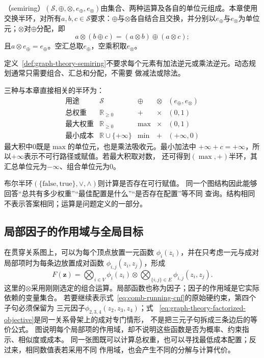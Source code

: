\begin{definition}[交换半环]
\label{def:graph-theory-semiring}
（semiring）$(\mathcal S,\oplus,\otimes,e_{\oplus},e_{\otimes})$由集合、两种运算及各自的单位元组成。本章使用交换半环，对所有$a,b,c\in\mathcal S$要求：$\oplus$与$\otimes$各自结合且交换，并分别以$e_{\oplus}$与$e_{\otimes}$为单位元；$\otimes$对$\oplus$分配，即
\[
 a\otimes(b\oplus c)=(a\otimes b)\oplus(a\otimes c);
\]
且$a\otimes e_{\oplus}=e_{\oplus}$。空汇总取$e_{\oplus}$，空乘积取$e_{\otimes}$。
\end{definition}

定义~\ref{def:graph-theory-semiring}不要求每个元素有加法逆元或乘法逆元。动态规划通常只需要组合、汇总和分配，不需要
做减法或除法。

三种与本章直接相关的半环为：
\[
\begin{array}{c|c|c|c|c}
  \text{用途}&\mathcal{S}&\oplus&\otimes&(e_{\oplus},e_{\otimes})\\
  \hline
  \text{总权重}&\mathbb{R}_{\geq0}&+&\times&(0,1)\\
  \text{最大权重}&\mathbb{R}_{\geq0}&\max&\times&(0,1)\\
  \text{最小成本}&\mathbb{R}\cup\{+\infty\}&\min&+&(+\infty,0)
\end{array}
\]
最大积中\(0\)既是\(\max\)的单位元，也是乘法吸收元。最小加法中
\(+\infty+c=+\infty\)，所以\(+\infty\)表示不可行路径或赋值。若最大积取对数，
还可得到\((\max,+)\)半环，其汇总单位元为\(-\infty\)、组合单位元为\(0\)。

布尔半环\((\{\mathrm{false},\mathrm{true}\},\lor,\land)\)则计算是否存在可行赋值。
同一个图结构因此能够回答“总共有多少权重”“最佳配置是什么”“是否存在配置”等不同
查询。结构相同不表示答案相同；运算是问题定义的一部分。

\subsection{局部因子的作用域与全局目标}

在贯穿关系图上，可以为每个顶点放置一元函数
\(\phi_i(z_i)\)，并在只考虑一元与成对局部项时为每条边放置成对函数
\(\phi_{i,j}(z_i,z_j)\)，形成
\begin{equation}
  F(\bm{z})=
  \bigotimes_{i\in V}\phi_i(z_i)\otimes
  \bigotimes_{\{i,j\}\in E}\phi_{i,j}(z_i,z_j).
  \label{eq:graph-theory-factorized-objective}
\end{equation}
这里的\(\otimes\)采用刚刚选定的组合运算。局部函数也称为因子；因子的作用域是它实际依赖的变量集合。
若要继续表示式~\eqref{eq:comb-running-cnf}的原始硬约束，第四个子句必须保留为
三元因子\(\phi_{2,3,4}(z_2,z_3,z_4)\)；式
~\eqref{eq:graph-theory-factorized-objective}是同一关系骨架上的成对专门情形，
不是把三元子句拆成三条边后的等价公式。
图说明每个局部项的作用域，却不说明这些函数是否为概率、约束指示、相似度或成本。
同一张图既可以计算总权重，也可以寻找最低成本配置；反过来，相同数值表若采用不同
作用域，也会产生不同的分解与计算代价。

